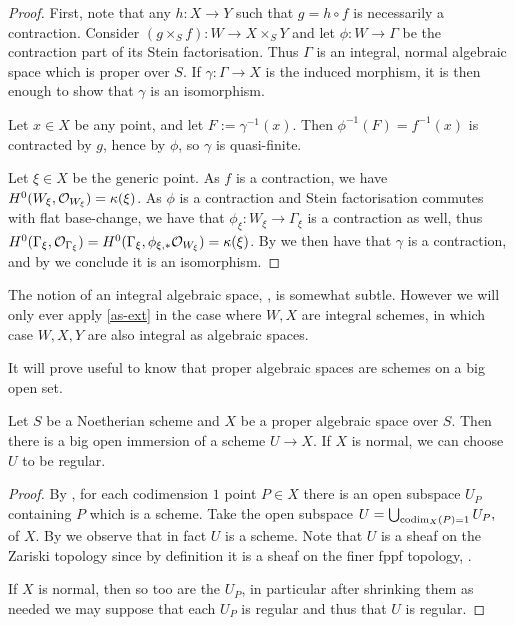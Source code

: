 	\begin{proof}
		First, note that any $h\colon X\to Y$ such that $g=h \circ f$ is necessarily a contraction.
		Consider $(g\times_S f)\colon W \to X \times_S Y$ and let $\phi \colon W \to \Gamma$ be the contraction part of its Stein factorisation.
		Thus $\Gamma$ is an integral, normal algebraic space which is proper over $S$. If $\gamma\colon \Gamma\to X$ is the induced morphism, it is then enough to show that $\gamma$ is an isomorphism.
		
		Let $x\in X$ be any point, and let $F:=\gamma^{-1}(x)$. Then $\phi^{-1}(F)=f^{-1}(x)$ is contracted by $g$, hence by $\phi$, so $\gamma$ is quasi-finite.
		
		Let $\xi\in X$ be the generic point. As $f$ is a contraction, we have $H^0(W_\xi,\mathcal{O}_{W_\xi})=\kappa(\xi)$. As $\phi$ is a contraction and Stein factorisation commutes with flat base-change, we have that $\phi_\xi\colon W_\xi\to\Gamma_\xi$ is a contraction as well, thus $H^0(\Gamma_\xi,\mathcal{O}_{\Gamma_\xi})=H^0(\Gamma_\xi,\phi_{\xi,*}\mathcal{O}_{W_\xi})=\kappa(\xi)$. By \cite[\href{https://stacks.math.columbia.edu/tag/0AYI}{Tag 0AYI}]{stacks-project} we then have that $\gamma$ is a contraction, and by \cite[\href{https://stacks.math.columbia.edu/tag/082I}{Tag 082I}]{stacks-project} we conclude it is an isomorphism.
	\end{proof}
	
	\begin{remark}
		The notion of an integral algebraic space, \cite[Tag 0AD3]{stacks-project}, is somewhat subtle. However we will only ever apply \autoref{as-ext} in the case where $W,X$ are integral schemes, in which case $W,X,Y$ are also integral as algebraic spaces.
	\end{remark}
	
	It will prove useful to know that proper algebraic spaces are schemes on a big open set.
	
	\begin{lemma}\label{l-cod1}
		Let $S$ be a Noetherian scheme and $X$ be a proper algebraic space over $S$. 
		Then there is a big open immersion of a scheme $U\to X$.
		If $X$ is normal, we can choose $U$ to be regular.
	\end{lemma}
	
	\begin{proof}
		By , for each codimension $1$ point $P \in X$ there is an open subspace $U_{P}$ containing $P$ which is a scheme.
		Take the open subspace   $U=\bigcup_{\textup{codim}_X(P)=1} U_{P},$
		of $X$.
		By \cite[\href{https://stacks.math.columbia.edu/tag/01JJ}{Tag 01JJ}]{stacks-project} we observe that in fact $U$ is a scheme. Note that $U$ is a sheaf on the Zariski topology since by definition it is a sheaf on the finer fppf topology, . 
		
		If $X$ is normal, then so too are the $U_{P}$, in particular after shrinking them as needed we may suppose that each $U_{P}$ is regular and thus that $U$ is regular.
	\end{proof}
	
